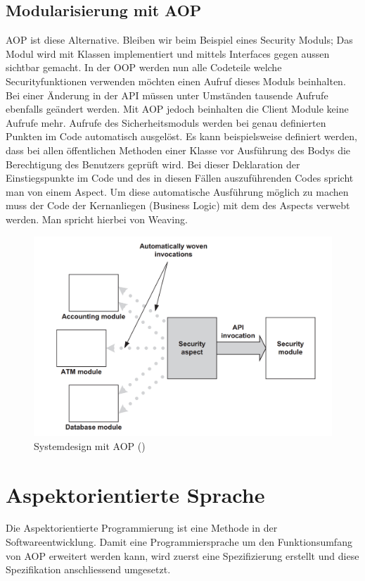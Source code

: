 \subsection{Modularisierung mit AOP}
\label{sec:aop_modaop}
AOP ist diese Alternative. Bleiben wir beim Beispiel eines Security Moduls; Das Modul wird mit Klassen implementiert und mittels Interfaces gegen aussen sichtbar gemacht. In der OOP werden nun alle Codeteile welche Securityfunktionen verwenden möchten einen Aufruf dieses Moduls beinhalten. Bei einer Änderung in der API müssen unter Umständen tausende Aufrufe ebenfalls geändert werden. Mit AOP jedoch beinhalten die Client Module keine Aufrufe mehr. Aufrufe des Sicherheitsmoduls werden bei genau definierten Punkten im Code automatisch ausgelöst. Es kann beispielsweise definiert werden, dass bei allen öffentlichen Methoden einer Klasse vor Ausführung des Bodys die Berechtigung des Benutzers geprüft wird. Bei dieser Deklaration der Einstiegspunkte im Code und des in diesen Fällen auszuführenden Codes spricht man von einem Aspect. Um diese automatische Ausführung möglich zu machen muss der Code der Kernanliegen (Business Logic) mit dem des Aspects verwebt werden. Man spricht hierbei von Weaving.
\begin{figure}[H]
	\centering
		\includegraphics[scale=0.5]{bilder/motivationAop.png}
	\caption{Systemdesign mit AOP (\cite[p~55]{laddad:aspectj})}
	\label{fig:motivationaop}
\end{figure}

\section{Aspektorientierte Sprache}
\label{sec:aop_lang}
Die Aspektorientierte Programmierung ist eine Methode in der Softwareentwicklung. Damit eine Programmiersprache um den Funktionsumfang von AOP erweitert werden kann, wird zuerst eine Spezifizierung erstellt und diese Spezifikation anschliessend umgesetzt.

